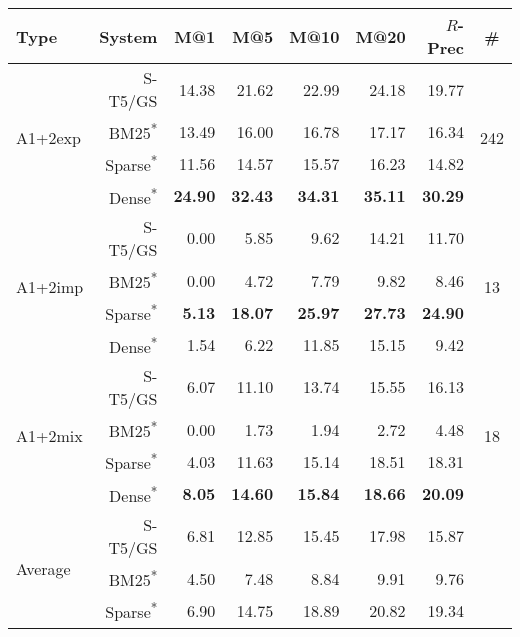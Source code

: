 \documentclass[11pt]{article}
\begin{document}
\begin{table*}[]
    \centering
    \begin{tabular}{l|r|r|r|r|r|r|c}
       Type &  System &  M@1 &  M@5 &  M@10 &  M@20 &  $R$-Prec &  \# \\
    \hline
    \hline
    \multirow{4}{4em}{A1+2exp} &    S-T5/GS &  14.38 &  21.62 &   22.99 &   24.18 &        19.77 &      \multirow{4}{2em}{242} \\
     &    BM25\textsuperscript{*} &  13.49 &  16.00 &   16.78 &   17.17 &        16.34 &       \\
     &    Sparse\textsuperscript{*} &  11.56 &  14.57 &   15.57 &   16.23 &        14.82 &       \\
     &    Dense\textsuperscript{*} &  \textbf{24.90} &  \textbf{32.43} &   \textbf{34.31} &   \textbf{35.11} &        \textbf{30.29} &       \\
    \hline
    \multirow{4}{4em}{A1+2imp} &    S-T5/GS &   0.00 &   5.85 &    9.62 &   14.21 &        11.70 &       \multirow{4}{2em}{13} \\
     &    BM25\textsuperscript{*} &   0.00 &   4.72 &    7.79 &    9.82 &         8.46 &        \\
     &    Sparse\textsuperscript{*} &   \textbf{5.13} &  \textbf{18.07} &   \textbf{25.97} &   \textbf{27.73} &        \textbf{24.90} &        \\
     &    Dense\textsuperscript{*} &   1.54 &   6.22 &   11.85 &   15.15 &         9.42 &        \\
    \hline
    \multirow{4}{4em}{A1+2mix} &    S-T5/GS &   6.07 &  11.10 &   13.74 &   15.55 &        16.13 &       \multirow{4}{2em}{18} \\
     &    BM25\textsuperscript{*} &   0.00 &   1.73 &    1.94 &    2.72 &         4.48 &        \\
     &    Sparse\textsuperscript{*} &   4.03 &  11.63 &   15.14 &   18.51 &        18.31 &        \\
     &    Dense\textsuperscript{*} &   \textbf{8.05} &  \textbf{14.60} &   \textbf{15.84} &   \textbf{18.66} &        \textbf{20.09} &        \\
    \hline
    \hline
       \multirow{4}{4em}{Average} &    S-T5/GS &   6.81 &  12.85 &   15.45 &   17.98 &        15.87 &        \\
        &    BM25\textsuperscript{*} &   4.50 &   7.48 &    8.84 &    9.91 &         9.76 &         \\
        &    Sparse\textsuperscript{*} &   6.90 &  14.75 &   18.89 &   20.82 &        19.34 &        \\

\end{tabular}
\end{table*}
\end{document}
